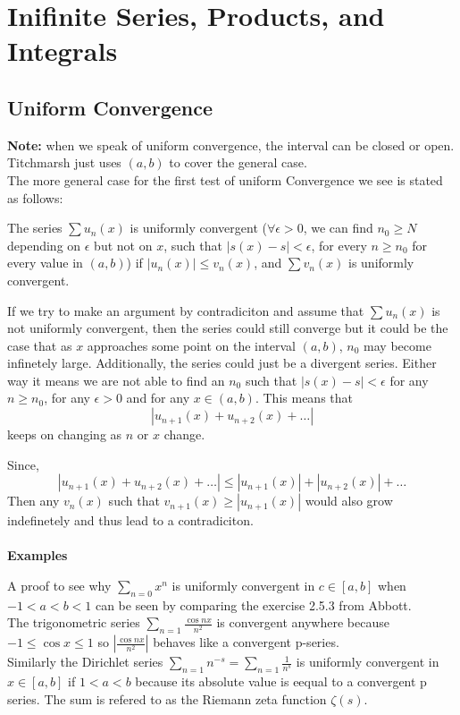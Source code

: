 \section{Inifinite Series, Products, and Integrals}

\subsection{Uniform Convergence}

\textbf{Note:} when we speak of uniform convergence, the interval can be closed or open.
Titchmarsh just uses $(a,b)$ to cover the general case.
\\

The more general case for the first test of uniform Convergence we see is stated as follows:

The series $\sum u_n(x)$ is uniformly convergent
($\forall \epsilon>0$, we can find $n_0 \geq N$ depending on $\epsilon$ but not on $x$,
such that $|s(x) - s|<\epsilon$, for every $n\geq n_0$ for every value in $(a,b)$)
if $|u_n(x)| \leq v_n(x)$, and $\sum v_n(x)$ is uniformly convergent.

If we try to make an argument by contradiciton and assume that $\sum u_n(x)$ is not
uniformly convergent, then the series could still converge but it could be the case that
as $x$ approaches some point on the interval $(a,b)$, $n_0$ may become infinetely large.
Additionally, the series could just be a divergent series.
Either way it means we are not able to find an $n_0$ such that $|s(x) - s| < \epsilon$
for any $n \geq n_0$, for any $\epsilon >0$ and for any $x\in (a,b)$.
This means that
$$
|u_{n+1}(x) + u_{n+2}(x) + \ldots |
$$
keeps on changing as $n$ or $x$ change.

Since,
$$
|u_{n+1}(x) + u_{n+2}(x) + \ldots | \leq |u_{n+1}(x)| + |u_{n+2}(x)| + \ldots
$$
Then any $v_n(x)$ such that $v_{n+1}(x) \geq |u_{n+1}(x)|$ would also grow indefinetely and thus
lead to a contradiciton.
\\~\\

\textbf{Examples}

A proof to see why $\sum_{n=0} x^n$ is uniformly convergent in $c\in [a,b]$
when $-1 < a < b < 1$ can be seen by comparing the exercise 2.5.3 from Abbott.
\\

The trigonometric series $\sum_{n=1} \frac{\cos nx}{n^2}$ is convergent anywhere because
$-1 \leq \cos x \leq 1$ so $\left| \frac{\cos nx}{n^2} \right|$ behaves like a convergent p-series.
\\

Similarly the Dirichlet series $\sum_{n=1} n^{-s} = \sum_{n=1} \frac{1}{n^s}$ is uniformly convergent
in $x\in [a,b]$ if $1 < a < b$ because its absolute value is eequal to a convergent p series.
The sum is refered to as the Riemann zeta function $\zeta (s)$.